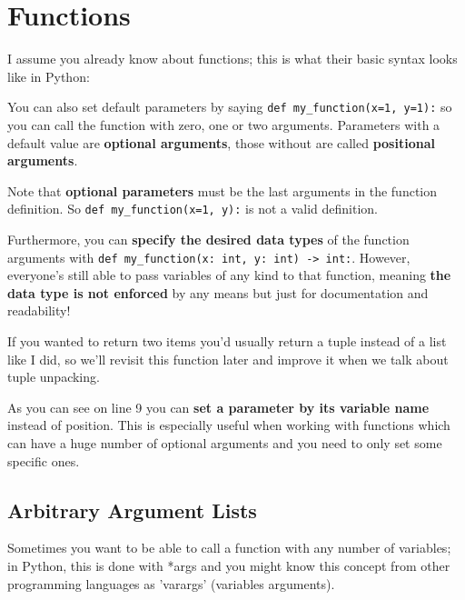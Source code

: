 \section{Functions}

    I assume you already know about functions; this is what their basic syntax looks like in Python:


    You can also set default parameters by saying
    \texttt{def my_function(x=1, y=1):}
    so you can call the function with zero, one or two arguments.
    Parameters with a default value are \textbf{optional arguments}, those without are called
    \textbf{positional arguments}.

    Note that \textbf{optional parameters} must be the last arguments in the function definition.
    So \texttt{def my_function(x=1, y):} is not a valid definition.

    Furthermore, you can \textbf{specify the desired data types} of the function arguments with
    \texttt{def my_function(x: int, y: int) -> int:}.
    However, everyone's still able to pass variables of any kind to that function,
    meaning \textbf{the data type is not enforced} by any means but just
    for documentation and readability!


    If you wanted to return two items you'd usually return a tuple instead of a list like I did,
    so we'll revisit this function later and improve it when we talk about tuple unpacking.

    As you can see on line 9 you can \textbf{set a parameter by its variable name}
    instead of position.
    This is especially useful when working with functions which can have a huge number of optional
    arguments and you need to only set some specific ones.

    \subsection{Arbitrary Argument Lists}

        Sometimes you want to be able to call a function with any number of variables;
        in Python, this is done with *args and you might know this concept from other programming
        languages as 'varargs' (variables arguments).

